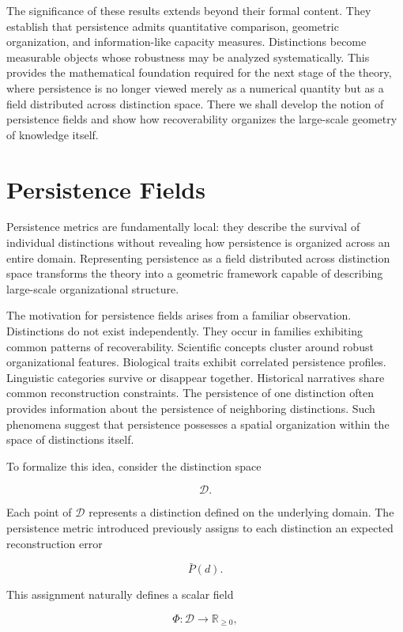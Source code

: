 \documentclass[12pt,oneside]{article}
\theoremstyle{definition}
\begin{document}
The significance of these results extends beyond their formal content. They establish that persistence admits quantitative comparison, geometric organization, and information-like capacity measures. Distinctions become measurable objects whose robustness may be analyzed systematically. This provides the mathematical foundation required for the next stage of the theory, where persistence is no longer viewed merely as a numerical quantity but as a field distributed across distinction space. There we shall develop the notion of persistence fields and show how recoverability organizes the large-scale geometry of knowledge itself.

\section{Persistence Fields}

Persistence metrics are fundamentally local: they describe the survival of individual distinctions without revealing how persistence is organized across an entire domain. Representing persistence as a field distributed across distinction space transforms the theory into a geometric framework capable of describing large-scale organizational structure.

The motivation for persistence fields arises from a familiar observation. Distinctions do not exist independently. They occur in families exhibiting common patterns of recoverability. Scientific concepts cluster around robust organizational features. Biological traits exhibit correlated persistence profiles. Linguistic categories survive or disappear together. Historical narratives share common reconstruction constraints. The persistence of one distinction often provides information about the persistence of neighboring distinctions. Such phenomena suggest that persistence possesses a spatial organization within the space of distinctions itself.

To formalize this idea, consider the distinction space

\[
\mathcal D.
\]

Each point of \(\mathcal D\) represents a distinction defined on the underlying domain. The persistence metric introduced previously assigns to each distinction an expected reconstruction error

\[
\bar P(d).
\]

This assignment naturally defines a scalar field

\[
\Phi :
\mathcal D
\rightarrow
\mathbb R_{\ge 0},
\]
\end{document}
